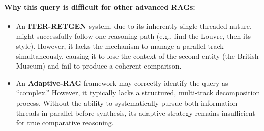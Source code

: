 \documentclass[11pt]{article}
\begin{document}
\paragraph{Why this query is difficult for other advanced RAGs:}
\begin{itemize}
    \item An \textbf{ITER-RETGEN} system, due to its inherently single-threaded nature, might successfully follow one reasoning path (e.g., find the Louvre, then its style). However, it lacks the mechanism to manage a parallel track simultaneously, causing it to lose the context of the second entity (the British Museum) and fail to produce a coherent comparison.
    \item An \textbf{Adaptive-RAG} framework may correctly identify the query as ``complex.'' However, it typically lacks a structured, multi-track decomposition process. Without the ability to systematically pursue both information threads in parallel before synthesis, its adaptive strategy remains insufficient for true comparative reasoning.
\end{itemize}
\end{document}
